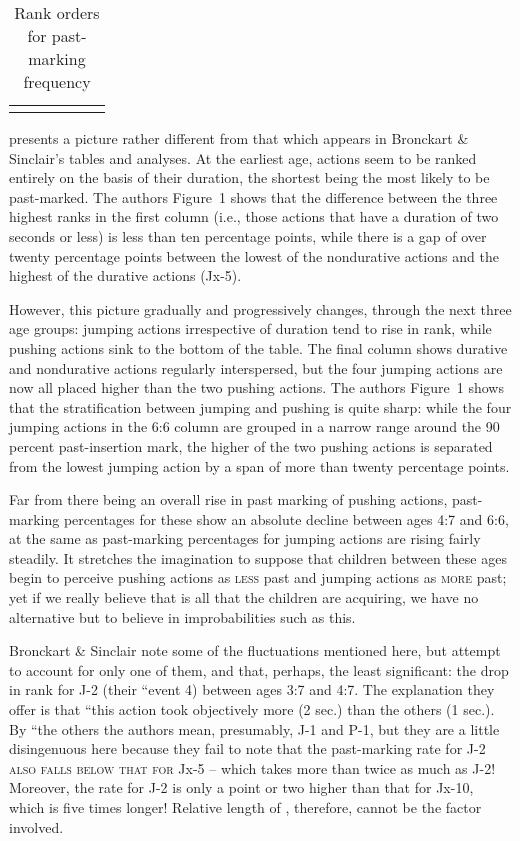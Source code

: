 \begin{table}
\begin{center}
\begin{tabular}{cccccc}
			\lspbottomrule
		\end{tabular}
	\end{center}
	\caption{Rank orders for past-marking frequency}\label{tab:3.3}
\end{table}


 presents a picture rather different from that which appears in Bronckart \& Sinclair's tables and analyses. At the earliest age, actions seem to be ranked entirely on the basis of their duration, the shortest being the most likely to be past-marked. The authors Figure~1 shows that the difference between the three highest ranks in the first column (i.e., those actions that have a duration of two seconds or less) is less than ten percentage points, while there is a gap of over twenty percentage points between the lowest of the nondurative actions and the highest of the durative actions (Jx-5).

However, this picture gradually and progressively changes, through the next three age groups: jumping actions irrespective of duration tend to rise in rank, while pushing actions sink to the bottom of the table. The final column shows durative and nondurative actions regularly interspersed, but the four jumping actions are now all placed higher than the two pushing actions. The authors Figure~1 shows that the stratification between jumping and pushing is quite sharp: while the
four jumping actions in the 6:6 column are grouped in a narrow range around the 90 percent past-insertion mark, the higher of the two pushing actions is separated from the lowest jumping action by a span of more than twenty percentage points.

Far from there being an overall rise in past marking of pushing actions, past-marking percentages for these show an absolute decline between ages 4:7 and 6:6, at the same  as past-marking percentages for jumping actions are rising fairly steadily. It stretches the imagina\-tion to suppose that children between these ages begin to perceive pushing actions as \textsc{less} past and jumping actions as \textsc{more} past; yet if we really believe that  is all that the children are acquiring, we have no alternative but to believe in improbabilities such as this.

Bronckart \& Sinclair note some of the fluctuations mentioned here, but attempt to account for only one of them, and that, perhaps, the least significant: the drop in rank for J-2 (their ``event 4) be\-tween ages 3:7 and 4:7. The explanation they offer is that ``this action took objectively more  (2 sec.) than the others (1 sec.). By ``the others the authors mean, presumably, J-1 and P-1, but they are a little disingenuous here because they fail to note that the past-marking rate for J-2 \textsc{also falls below that for} Jx-5 -- which takes more than twice as much  as J-2! Moreover, the rate for J-2 is only a point or two higher than that for Jx-10, which is five times longer! Relative length of , therefore, cannot be the factor involved.

